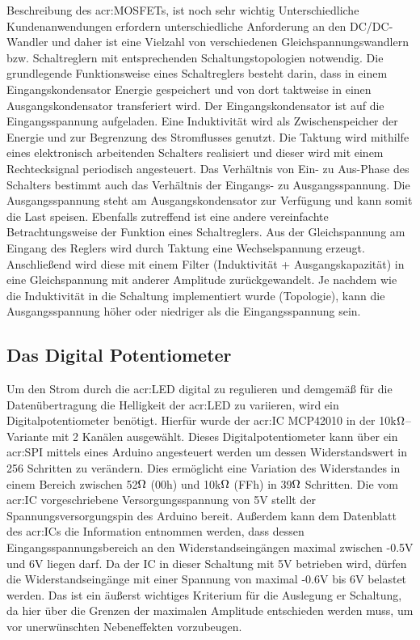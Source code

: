 Beschreibung des \gls{acr:MOSFET}s, ist noch sehr wichtig
Unterschiedliche Kundenanwendungen erfordern unterschiedliche Anforderung an den
DC/DC-Wandler und daher ist eine Vielzahl von verschiedenen Gleichspannungswandlern bzw. Schaltreglern mit entsprechenden Schaltungstopologien notwendig.
Die grundlegende Funktionsweise eines Schaltreglers besteht darin, dass in einem
Eingangskondensator Energie gespeichert und von dort taktweise in einen Ausgangskondensator transferiert wird. Der Eingangskondensator ist auf die Eingangsspannung aufgeladen. Eine Induktivität wird als Zwischenspeicher der Energie und zur
Begrenzung des Stromflusses genutzt. Die Taktung wird mithilfe eines elektronisch
arbeitenden Schalters realisiert und dieser wird mit einem Rechtecksignal periodisch
angesteuert. Das Verhältnis von Ein- zu Aus-Phase des Schalters bestimmt auch das
Verhältnis der Eingangs- zu Ausgangsspannung. Die Ausgangsspannung steht am
Ausgangskondensator zur Verfügung und kann somit die Last speisen.
Ebenfalls zutreffend ist eine andere vereinfachte Betrachtungsweise der Funktion eines
Schaltreglers. Aus der Gleichspannung am Eingang des Reglers wird durch Taktung
eine Wechselspannung erzeugt. Anschließend wird diese mit einem Filter (Induktivität
+ Ausgangskapazität) in eine Gleichspannung mit anderer Amplitude zurückgewandelt.
Je nachdem wie die Induktivität in die Schaltung implementiert wurde (Topologie), kann
die Ausgangsspannung höher oder niedriger als die Eingangsspannung sein.


\newpage
\subsection{Das Digital Potentiometer}
\label{subsec:Unterabschnitt12}

Um den Strom durch die \gls{acr:LED} digital zu regulieren und demgemäß für die Datenübertragung die Helligkeit der \gls{acr:LED} zu variieren, wird ein Digitalpotentiometer benötigt. Hierfür wurde der \gls{acr:IC} MCP42010 in der 10k$\ohm$–Variante mit 2 Kanälen ausgewählt. Dieses Digitalpotentiometer kann über ein \gls{acr:SPI} mittels eines Arduino angesteuert werden um dessen Widerstandswert in 256 Schritten zu verändern. Dies ermöglicht eine Variation des Widerstandes in einem Bereich zwischen 52$\ohm$ (00h) und 10k$\ohm$ (FFh) in 39$\ohm$ Schritten. 
Die vom \gls{acr:IC} vorgeschriebene Versorgungsspannung von 5V stellt der Spannungsversorgungspin des Arduino bereit. Außerdem kann dem Datenblatt des \gls{acr:IC}s die Information entnommen werden, dass dessen Eingangsspannungsbereich an den Widerstandseingängen maximal zwischen -0.5V und 6V liegen darf. Da der IC in dieser Schaltung mit 5V betrieben wird, dürfen die Widerstandseingänge mit einer Spannung von maximal -0.6V bis 6V belastet werden. Das ist ein äußerst wichtiges Kriterium für die Auslegung er Schaltung, da hier über die Grenzen der maximalen Amplitude entschieden werden muss, um vor unerwünschten Nebeneffekten vorzubeugen.

